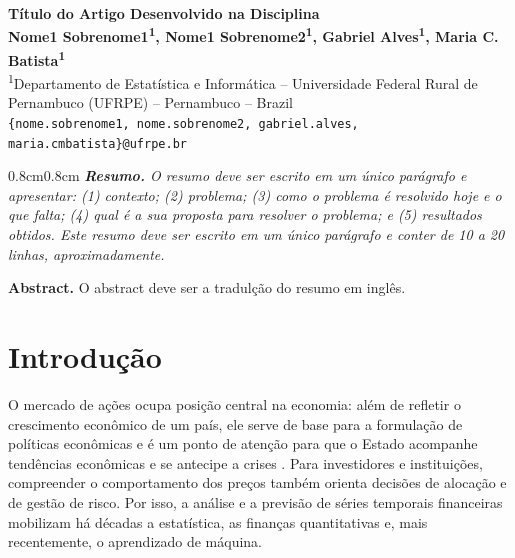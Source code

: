 \documentclass[12pt,a4paper]{article}
\begin{document}
\begin{center}
  {\fontsize{16pt}{19pt}\selectfont\bfseries
   Título do Artigo Desenvolvido na Disciplina}\\[12pt]
  {\bfseries Nome1 Sobrenome1\textsuperscript{1}, Nome1 Sobrenome2\textsuperscript{1},
   Gabriel Alves\textsuperscript{1}, Maria C. Batista\textsuperscript{1}}\\[12pt]
  {\textsuperscript{1}Departamento de Estatística e Informática – Universidade Federal
   Rural de Pernambuco (UFRPE) – Pernambuco – Brazil}\\[6pt]
  {\footnotesize\texttt{\{nome.sobrenome1, nome.sobrenome2, gabriel.alves,
   maria.cmbatista\}@ufrpe.br}}
\end{center}

\begin{adjustwidth}{0.8cm}{0.8cm}
\itshape
\textbf{Resumo.} O resumo deve ser escrito em um único parágrafo e apresentar:
(1) contexto; (2) problema; (3) como o problema é resolvido hoje e o que falta;
(4) qual é a sua proposta para resolver o problema; e (5) resultados obtidos.
Este resumo deve ser escrito em um único parágrafo e conter de 10 a 20 linhas,
aproximadamente.

\textbf{Abstract.} O abstract deve ser a tradulção do resumo em inglês.
\end{adjustwidth}

\section{Introdução}\label{sec:introducao}

O mercado de ações ocupa posição central na economia: além de refletir o crescimento econômico de um país, ele serve de base para a formulação de políticas econômicas \parencite{li_accurate_2024} e é um ponto de atenção para que o Estado acompanhe tendências econômicas e se antecipe a crises \parencite{sun_novel_2024}. Para investidores e instituições, compreender o comportamento dos preços também orienta decisões de alocação e de gestão de risco. Por isso, a análise e a previsão de séries temporais financeiras mobilizam há décadas a estatística, as finanças quantitativas e, mais recentemente, o aprendizado de máquina.
\end{document}
